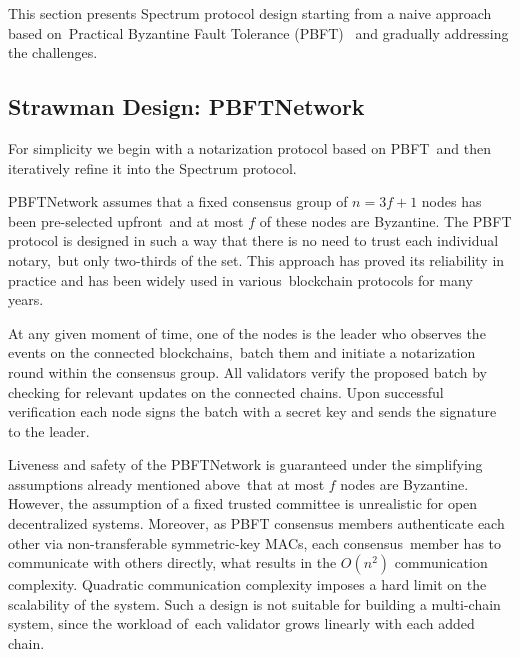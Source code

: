 This section presents Spectrum protocol design starting from a naive approach based on\
Practical Byzantine Fault Tolerance (PBFT)~\cite{Castro2001} and gradually addressing the challenges.

\subsection{Strawman Design: PBFTNetwork}\label{subsec:strawman-design}

For simplicity we begin with a notarization protocol based on PBFT\
and then iteratively refine it into the Spectrum protocol.

PBFTNetwork assumes that a fixed consensus group of ${n = 3f + 1}$ nodes has been pre-selected upfront\
and at most $f$ of these nodes are Byzantine.
The PBFT protocol is designed in such a way that there is no need to trust each individual notary,\
but only two-thirds of the set.
This approach has proved its reliability in practice and has been widely used in various\
blockchain protocols for many years.

At any given moment of time, one of the nodes is the leader who observes the events on the connected blockchains,\
batch them and initiate a notarization round within the consensus group.
All validators verify the proposed batch by checking for relevant updates on the connected chains.
Upon successful verification each node signs the batch with a secret key and sends the signature to the leader.

Liveness and safety of the PBFTNetwork is guaranteed under the simplifying assumptions already mentioned above\
that at most $f$ nodes are Byzantine.
However, the assumption of a fixed trusted committee is unrealistic for open decentralized systems.
Moreover, as PBFT consensus members authenticate each other via non-transferable symmetric-key MACs, each consensus\
member has to communicate with others directly, what results in the $O(n^2)$ communication complexity.
Quadratic communication complexity imposes a hard limit on the scalability of the system.
Such a design is not suitable for building a multi-chain system, since the workload of\
each validator grows linearly with each added chain.

